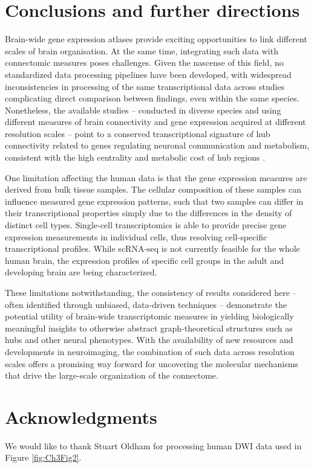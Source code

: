 \section{Conclusions and further directions}

Brain-wide gene expression atlases provide exciting opportunities to link different scales of brain organisation. At the same time, integrating such data with connectomic measures poses challenges. Given the nascense of this field, no standardized data processing pipelines have been developed, with widespread inconsistencies in processing of the same transcriptional data across studies \newline \citep{Arnatkeviciute2019} complicating direct comparison between findings, even within the same species. Nonetheless, the available studies -- conducted in diverse species and using different measures of brain connectivity and gene expression acquired at different resolution scales -- point to a conserved transcriptional signature of hub connectivity related to genes regulating neuronal communication and metabolism, consistent with the high centrality and metabolic cost of hub regions \citep{Bullmore2009}.

One limitation affecting the human data is that the gene expression measures are derived from bulk tissue samples. The cellular composition of these samples can influence measured gene expression patterns, such that two samples can differ in their transcriptional properties simply due to the differences in the density of distinct cell types. Single-cell transcriptomics is able to provide precise gene expression measurements in individual cells, thus resolving cell-specific transcriptional profiles. While scRNA-seq is not currently feasible for the whole human brain, the expression profiles of specific cell groups in the adult \citep{Johnson2015a,Hu2017,Picardi2017} and developing brain \citep{Zhong2018} are being characterized.

These limitations notwithstanding, the consistency of results considered here -- often identified through unbiased, data-driven techniques -- demonstrate the potential utility of brain-wide transcriptomic measures in yielding biologically meaningful insights to otherwise abstract graph-theoretical structures such as hubs and other neural phenotypes. With the availability of new resources and developments in neuroimaging, the combination of such data across resolution scales offers a promising way forward for uncovering the molecular mechanisms that drive the large-scale organization of the connectome.

\section*{Acknowledgments}

We would like to thank Stuart Oldham for processing human DWI data used in Figure \ref{fig:Ch3Fig2}.
